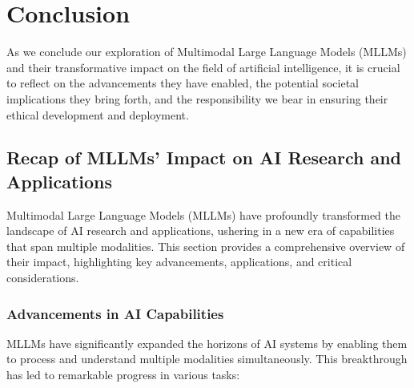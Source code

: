 \chapter{Conclusion}

As we conclude our exploration of Multimodal Large Language Models (MLLMs) and their transformative impact on the field of artificial intelligence, it is crucial to reflect on the advancements they have enabled, the potential societal implications they bring forth, and the responsibility we bear in ensuring their ethical development and deployment.

\section{Recap of MLLMs' Impact on AI Research and Applications}

Multimodal Large Language Models (MLLMs) have profoundly transformed the landscape of AI research and applications, ushering in a new era of capabilities that span multiple modalities. This section provides a comprehensive overview of their impact, highlighting key advancements, applications, and critical considerations.

\subsection{Advancements in AI Capabilities}

MLLMs have significantly expanded the horizons of AI systems by enabling them to process and understand multiple modalities simultaneously. This breakthrough has led to remarkable progress in various tasks:

